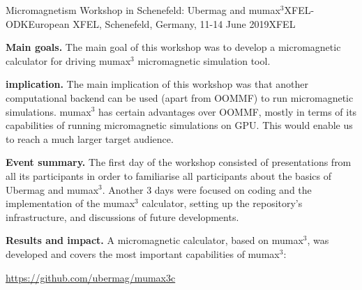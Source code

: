 \begin{event}{Micromagnetism Workshop in Schenefeld: Ubermag and mumax$^{3}$}{XFEL-ODK}{European XFEL, Schenefeld, Germany, 11-14 June 2019}{XFEL}{}{}{}

\textbf{Main goals.} The main goal of this workshop was to develop a
micromagnetic calculator for driving mumax$^{3}$ micromagnetic
simulation tool.

\textbf{\ODK implication.} The main implication of this workshop was
that another computational backend can be used (apart from OOMMF) to
run micromagnetic simulations. mumax$^{3}$ has certain advantages over
OOMMF, mostly in terms of its capabilities of running micromagnetic
simulations on GPU. This would enable us to reach a much larger target
audience.

\textbf{Event summary.} The first day of the workshop consisted of
presentations from all its participants in order to familiarise all
participants about the basics of Ubermag and mumax$^{3}$. Another 3
days were focused on coding and the implementation of the mumax$^{3}$
calculator, setting up the repository's infrastructure, and
discussions of future developments.

\textbf{Results and impact.} A micromagnetic calculator, based on
mumax$^{3}$, was developed and covers the most important capabilities
of mumax$^{3}$:

\centerline{\url{https://github.com/ubermag/mumax3c}}

\end{event}

